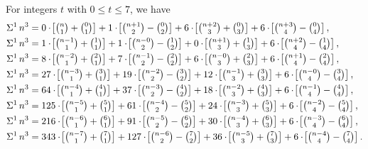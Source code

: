 \begin{example}
  For integers $t$ with $0 \le t \le 7$, we have
  \begin{align*}
    \KnuthRFoldSum{1}{n}{3}
    &= 0 \cdot \!\left[\tbinom{n}{1}+\tbinom{0}{1}\right]
    + 1 \cdot \!\left[\tbinom{n+1}{2}-\tbinom{0}{2}\right]
    + 6 \cdot \!\left[\tbinom{n+2}{3}+\tbinom{0}{3}\right]
    + 6 \cdot \!\left[\tbinom{n+3}{4}-\tbinom{0}{4}\right], \\
    \KnuthRFoldSum{1}{n}{3}
    &= 1 \cdot \!\left[\tbinom{n-1}{1}+\tbinom{1}{1}\right]
    + 1 \cdot \!\left[\tbinom{n-0}{2}-\tbinom{1}{2}\right]
    + 0 \cdot \!\left[\tbinom{n+1}{3}+\tbinom{1}{3}\right]
    + 6 \cdot \!\left[\tbinom{n+2}{4}-\tbinom{1}{4}\right], \\
    \KnuthRFoldSum{1}{n}{3}
    &= 8 \cdot \!\left[\tbinom{n-2}{1}+\tbinom{2}{1}\right]
    + 7 \cdot \!\left[\tbinom{n-1}{2}-\tbinom{2}{2}\right]
    + 6 \cdot \!\left[\tbinom{n-0}{3}+\tbinom{2}{3}\right]
    + 6 \cdot \!\left[\tbinom{n+1}{4}-\tbinom{2}{4}\right], \\
    \KnuthRFoldSum{1}{n}{3}
    &= 27 \cdot \!\left[\tbinom{n-3}{1}+\tbinom{3}{1}\right]
    + 19 \cdot \!\left[\tbinom{n-2}{2}-\tbinom{3}{2}\right]
    + 12 \cdot \!\left[\tbinom{n-1}{3}+\tbinom{3}{3}\right]
    + 6 \cdot \!\left[\tbinom{n-0}{4}-\tbinom{3}{4}\right], \\
    \KnuthRFoldSum{1}{n}{3}
    &= 64 \cdot \!\left[\tbinom{n-4}{1}+\tbinom{4}{1}\right]
    + 37 \cdot \!\left[\tbinom{n-3}{2}-\tbinom{4}{2}\right]
    + 18 \cdot \!\left[\tbinom{n-2}{3}+\tbinom{4}{3}\right]
    + 6 \cdot \!\left[\tbinom{n-1}{4}-\tbinom{4}{4}\right], \\
    \KnuthRFoldSum{1}{n}{3}
    &= 125 \cdot \!\left[\tbinom{n-5}{1}+\tbinom{5}{1}\right]
    + 61 \cdot \!\left[\tbinom{n-4}{2}-\tbinom{5}{2}\right]
    + 24 \cdot \!\left[\tbinom{n-3}{3}+\tbinom{5}{3}\right]
    + 6 \cdot \!\left[\tbinom{n-2}{4}-\tbinom{5}{4}\right], \\
    \KnuthRFoldSum{1}{n}{3}
    &= 216 \cdot \!\left[\tbinom{n-6}{1}+\tbinom{6}{1}\right]
    + 91 \cdot \!\left[\tbinom{n-5}{2}-\tbinom{6}{2}\right]
    + 30 \cdot \!\left[\tbinom{n-4}{3}+\tbinom{6}{3}\right]
    + 6 \cdot \!\left[\tbinom{n-3}{4}-\tbinom{6}{4}\right], \\
    \KnuthRFoldSum{1}{n}{3}
    &= 343 \cdot \!\left[\tbinom{n-7}{1}+\tbinom{7}{1}\right]
    + 127 \cdot \!\left[\tbinom{n-6}{2}-\tbinom{7}{2}\right]
    + 36 \cdot \!\left[\tbinom{n-5}{3}+\tbinom{7}{3}\right]
    + 6 \cdot \!\left[\tbinom{n-4}{4}-\tbinom{7}{4}\right].
  \end{align*}
\end{example}
